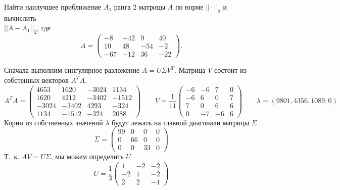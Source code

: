 
\begin{problem}
    Найти наилучшее приближение $A_1$ ранга $2$ матрицы $A$ по норме
    $||\cdot||_2$ и вычислить\\ $||A - A_1||_2$, где
    \begin{equation*}
        A =
        \begin{pmatrix}
            -8 & -42 & 9 & 40\\
            10 & 48 & -54 & -2\\
            -67 & -12 & 36 & -22
        \end{pmatrix}.
    \end{equation*}
\end{problem}


Сначала выполним сингулярное разложение $A = U \Sigma V^T$. Матрица $V$
состоит из собстенных векторов $A^TA$.
\begin{equation*}
    A^TA = \begin{pmatrix}
        4653 & 1620 & -3024 & 1134\\
        1620 & 4212 & -3402 & -1512\\
        -3024 & -3402 & 4293 & -324\\
        1134 & -1512 & -324 & 2088
    \end{pmatrix}
    \qquad
    V = \frac{1}{11}
    \begin{pmatrix}
        -6 & -6 & 7 & 0\\
        -6 & 6 & 0 & 7\\
        7 & 0 & 6 & 6\\
        0 & -7 & -6 & 6
    \end{pmatrix}
    \qquad
    \lambda = (9801, 4356, 1089, 0)
\end{equation*}
Корни из собственных значений $\lambda$ будут лежать на главной диагонали
матрицы $\Sigma$
\begin{equation*}
    \Sigma = \begin{pmatrix}
        99 & 0 & 0 & 0\\
        0 & 66 & 0 & 0\\
        0 & 0 & 33 & 0
    \end{pmatrix}
\end{equation*}
Т.~к. $AV = U\Sigma$, мы можем определить $U$
\begin{equation*}
    U = \frac{1}{3}
    \begin{pmatrix}
        1 & -2 & -2\\
        -2 & 1 & -2\\
        2 & 2 & -1
    \end{pmatrix}
\end{equation*}
